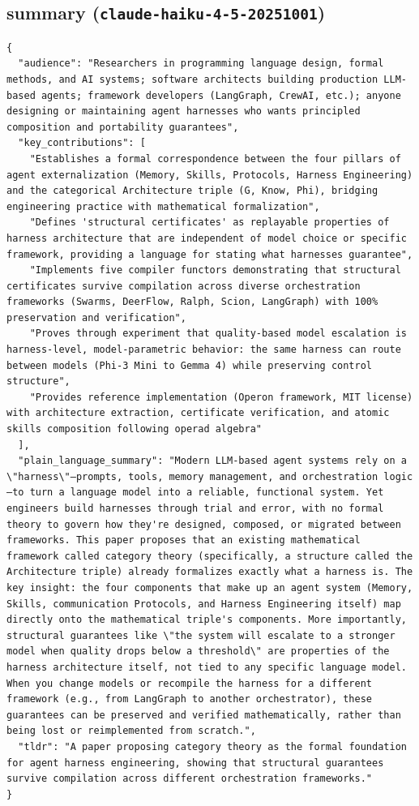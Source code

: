 \documentclass[11pt]{article}
\begin{document}
\subsection*{summary (\texttt{claude-haiku-4-5-20251001})}
\begin{verbatim}
{
  "audience": "Researchers in programming language design, formal methods, and AI systems; software architects building production LLM-based agents; framework developers (LangGraph, CrewAI, etc.); anyone designing or maintaining agent harnesses who wants principled composition and portability guarantees",
  "key_contributions": [
    "Establishes a formal correspondence between the four pillars of agent externalization (Memory, Skills, Protocols, Harness Engineering) and the categorical Architecture triple (G, Know, Phi), bridging engineering practice with mathematical formalization",
    "Defines 'structural certificates' as replayable properties of harness architecture that are independent of model choice or specific framework, providing a language for stating what harnesses guarantee",
    "Implements five compiler functors demonstrating that structural certificates survive compilation across diverse orchestration frameworks (Swarms, DeerFlow, Ralph, Scion, LangGraph) with 100% preservation and verification",
    "Proves through experiment that quality-based model escalation is harness-level, model-parametric behavior: the same harness can route between models (Phi-3 Mini to Gemma 4) while preserving control structure",
    "Provides reference implementation (Operon framework, MIT license) with architecture extraction, certificate verification, and atomic skills composition following operad algebra"
  ],
  "plain_language_summary": "Modern LLM-based agent systems rely on a \"harness\"—prompts, tools, memory management, and orchestration logic—to turn a language model into a reliable, functional system. Yet engineers build harnesses through trial and error, with no formal theory to govern how they're designed, composed, or migrated between frameworks. This paper proposes that an existing mathematical framework called category theory (specifically, a structure called the Architecture triple) already formalizes exactly what a harness is. The key insight: the four components that make up an agent system (Memory, Skills, communication Protocols, and Harness Engineering itself) map directly onto the mathematical triple's components. More importantly, structural guarantees like \"the system will escalate to a stronger model when quality drops below a threshold\" are properties of the harness architecture itself, not tied to any specific language model. When you change models or recompile the harness for a different framework (e.g., from LangGraph to another orchestrator), these guarantees can be preserved and verified mathematically, rather than being lost or reimplemented from scratch.",
  "tldr": "A paper proposing category theory as the formal foundation for agent harness engineering, showing that structural guarantees survive compilation across different orchestration frameworks."
}
\end{verbatim}
\end{document}

